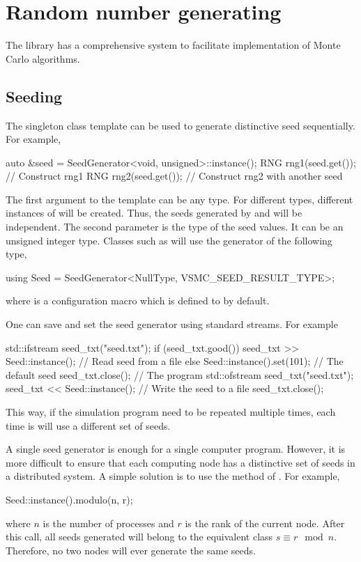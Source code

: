 \chapter{Random number generating}
\label{chap:Random number generating}

The library has a comprehensive \rng system to facilitate implementation of
Monte Carlo algorithms.

\section{Seeding}
\label{sec:Seeding}

The singleton class template  can be used to generate
distinctive seed sequentially. For example,
\begin{cppcode}
  auto &seed = SeedGenerator<void, unsigned>::instance();
  RNG rng1(seed.get()); // Construct rng1
  RNG rng2(seed.get()); // Construct rng2 with another seed
\end{cppcode}
The first argument to the template can be any type. For different types,
different instances of  will be created. Thus, the
seeds generated by  and
 will be independent. The second parameter is the
type of the seed values. It can be an unsigned integer type. Classes such as
 will use the generator of the following type,
\begin{cppcode}
  using Seed = SeedGenerator<NullType, VSMC_SEED_RESULT_TYPE>;
\end{cppcode}
where  is a configuration macro which is
defined to  by default.

One can save and set the seed generator using standard \cpp streams. For
example
\begin{cppcode}
  std::ifstream seed_txt("seed.txt");
  if (seed_txt.good())
      seed_txt >> Seed::instance(); // Read seed from a file
  else
      Seed::instance().set(101);    // The default seed
  seed_txt.close();
  // The program
  std::ofstream seed_txt("seed.txt");
  seed_txt << Seed::instance();     // Write the seed to a file
  seed_txt.close();
\end{cppcode}
This way, if the simulation program need to be repeated multiple times, each
time is will use a different set of seeds.

A single seed generator is enough for a single computer program. However, it is
more difficult to ensure that each computing node has a distinctive set of
seeds in a distributed system. A simple solution is to use the
 method of . For example,
\begin{cppcode}
  Seed::instance().modulo(n, r);
\end{cppcode}
where $n$ is the number of processes and $r$ is the rank of the current node.
After this call, all seeds generated will belong to the equivalent class $s
\equiv r\mod{n}$. Therefore, no two nodes will ever generate the same seeds.

